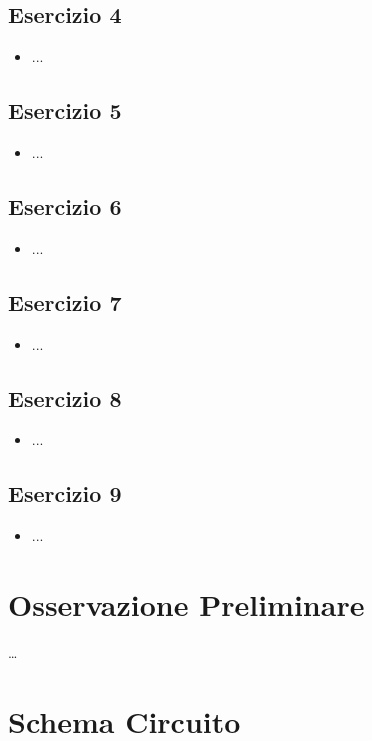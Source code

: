 \documentclass[a4paper]{article}
\begin{document}
\subsection{Esercizio 4}
\begin{itemize}
\item ...
\end{itemize}

\subsection{Esercizio 5}
\begin{itemize}
\item ...
\end{itemize}

\subsection{Esercizio 6}
\begin{itemize}
\item ...
\end{itemize}

\subsection{Esercizio 7}
\begin{itemize}
\item ...
\end{itemize}

\subsection{Esercizio 8}
\begin{itemize}
\item ...
\end{itemize}

\subsection{Esercizio 9}
\begin{itemize}
\item ...
\end{itemize}

\section{Osservazione Preliminare}
\dots

\section{Schema Circuito}
\end{document}
